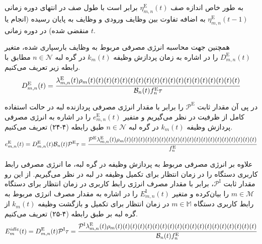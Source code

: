 به طور خاص اندازه صف $\eta_{m,n}^{\text{E}}(t)$ برابر است با طول صف در انتهای دوره زمانی  $\eta_{m,n}^{\text{E}}(t-1)$ به اضافه تفاوت بین وظایف ورودی و وظایف به پایان رسیده (انجام یا منقضی شده) در دوره زمانی $t$. 

همچنین جهت محاسبه انرژی مصرفی مربوط به وظایف بارسپاری شده، متغیر $D_{m,n}^{\text{E}}(t)$ را در اشاره به زمان پردازش وظیفه $k_m(t)$ در گره لبه $n \in \mathcal{N}$ مطابق با رابطه زیر تعریف می‌کنیم. 
\begin{alignat}{2}
	D_{m,n}^{\text{E}}(t) = { \lambda_{m,n}^{\text{E}}(t) \rho_m(t)(t)(t)(t)(t)(t)(t)(t)(t)(t)(t)(t)(t)(t)(t)(t)(t)(t)(t) \over  \mathcal{B}_n(t)f_n^{\text{E}} \tau}
	\label{112}  
\end{alignat}

در پی آن مقدار ثابت $\mathcal{P}^{\text{E}}$ را برابر با مقدار انرژی مصرفی پردازنده لبه در حالت استفاده کامل از ظرفیت در نظر می‌گیریم و متفیر $e_{m,n}^{\text{E}}(t)$ را در اشاره به انرژی مصرفی پردازش وظیفه $k_m(t)$ در گره لبه $n \in \mathcal{N}$ طبق رابطه (۴-۲۴) تعریف می‌کنیم. 
\begin{alignat}{2}
	e_{m,n}^{\text{E}}(t) = D_{m,n}^{\text{E}}(t) \mathcal{B}_n(t) \mathcal{P}^{\text{E}} \tau  = {\mathcal{P}^{\text{E}}  \lambda_{m,n}^{\text{E}}(t) \rho_m(t)(t)(t)(t)(t)(t)(t)(t)(t)(t)(t)(t)(t)(t)(t)(t)(t)(t)(t) \over  f_n^{\text{E}}}
	\label{113}  
\end{alignat}


علاوه بر انرژی مصرفی مربوط به پردازش وظیفه در گره لبه، ما انرژی مصرفی رابط کاربری دستگاه را در زمان انتظار برای تکمیل وظیفه در لبه در نظر می‌گیریم. از این رو مقدار ثابت $\mathcal{P}^{\text{I}}$، برابر با مقدار مصرف انرژی رابط کاربری در زمان انتظار برای دستگاه $m \in \mathcal{M}$ را بیان‌کرده و متغیر $E_{m,n}^{\text{I}}(t)$ را در اشاره به مقدار مصرف انرژی مربوط به رابط کاربری دستگاه $m \in \mathbb{M}$ در زمان انتظار برای تکمیل و بازگشت وظیفه $k_m(t)$ از گره لبه بر طبق رابطه (۴-۲۵) تعریف می‌کنیم.
\begin{alignat}{2}
	E_m^{idle}(t) = D_{m,n}^{\text{E}}(t) \mathcal{P}^{\text{I}} \tau  = {\mathcal{P}^{\text{I}}  \lambda_{m,n}^{\text{E}}(t) \rho_m(t)(t)(t)(t)(t)(t)(t)(t)(t)(t)(t)(t)(t)(t)(t)(t)(t)(t)(t) \over \mathcal{B}_n(t)  f_n^{\text{E}} }
	\label{114}  
\end{alignat}


